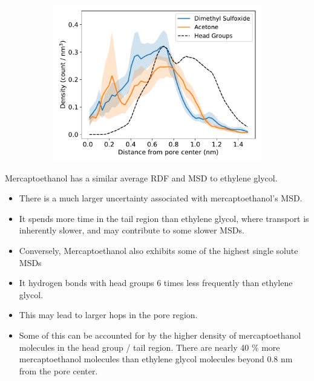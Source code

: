 \documentclass{article}
\begin{document}
\begin{figure}
\begin{subfigure}{0.325\linewidth}
  \includegraphics[width=\textwidth]{thiol_comparison_DMS.pdf}
  \caption{}\label{fig:DMP_GLY_comparison}
  \end{subfigure}
  \caption{}\label{fig:sulfur_analog_rdfs}
  \end{figure}
  
  \noindent Mercaptoethanol has a similar average RDF and MSD to ethylene glycol.
  \begin{itemize}
    \item There is a much larger uncertainty associated with mercaptoethanol's MSD.
    \item It spends more time in the tail region than ethylene glycol, where transport
    is inherently slower, and may contribute to some slower MSDs.  %
    \item Conversely, Mercaptoethanol also exhibits some of the highest single solute MSDs  %
    \item It hydrogen bonds with head groups 6 times less frequently than ethylene glycol.
    \item This may lead to larger hops in the pore region.
    \item Some of this can be accounted for by the higher density of mercaptoethanol 
    molecules in the head group / tail region. There are nearly 40 \% more mercaptoethanol
    molecules than ethylene glycol molecules beyond 0.8 nm from the pore center. 
  \end{itemize}
  
\end{document}
